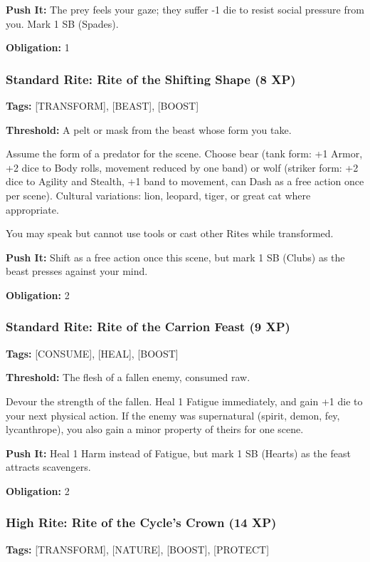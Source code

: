 \textbf{Push It:} The prey feels your gaze; they suffer -1 die to resist social pressure from you. Mark 1 SB (Spades).

\textbf{Obligation:} 1

\subsubsection{Standard Rite: Rite of the Shifting Shape (8 XP)}

\textbf{Tags:} [TRANSFORM], [BEAST], [BOOST]

\textbf{Threshold:} A pelt or mask from the beast whose form you take.

Assume the form of a predator for the scene. Choose bear (tank form: +1 Armor, +2 dice to Body rolls, movement reduced by one band) or wolf (striker form: +2 dice to Agility and Stealth, +1 band to movement, can Dash as a free action once per scene). Cultural variations: lion, leopard, tiger, or great cat where appropriate.

You may speak but cannot use tools or cast other Rites while transformed.

\textbf{Push It:} Shift as a free action once this scene, but mark 1 SB (Clubs) as the beast presses against your mind.

\textbf{Obligation:} 2

\subsubsection{Standard Rite: Rite of the Carrion Feast (9 XP)}

\textbf{Tags:} [CONSUME], [HEAL], [BOOST]

\textbf{Threshold:} The flesh of a fallen enemy, consumed raw.

Devour the strength of the fallen. Heal 1 Fatigue immediately, and gain +1 die to your next physical action. If the enemy was supernatural (spirit, demon, fey, lycanthrope), you also gain a minor property of theirs for one scene.

\textbf{Push It:} Heal 1 Harm instead of Fatigue, but mark 1 SB (Hearts) as the feast attracts scavengers.

\textbf{Obligation:} 2

\subsubsection{High Rite: Rite of the Cycle's Crown (14 XP)}

\textbf{Tags:} [TRANSFORM], [NATURE], [BOOST], [PROTECT]

